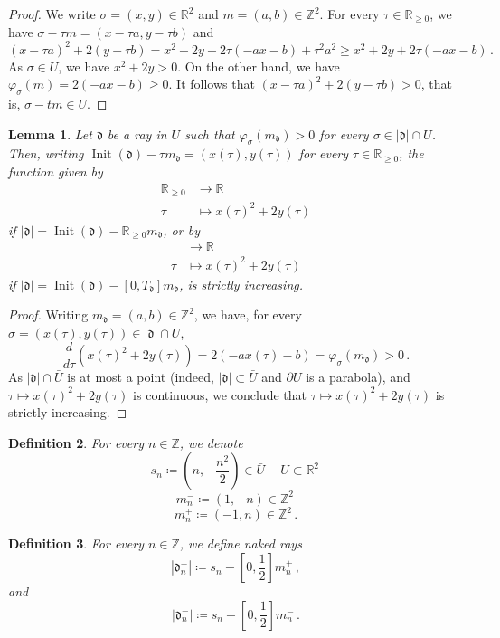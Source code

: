 \documentclass[12pt, a4paper]{amsart}
\newtheorem{defn}{Definition}[section]
\newtheorem{lem}[defn]{Lemma}
\newcommand\R{\mathbb R}
\newcommand\Z{\mathbb Z}
\newcommand\fd{\mathfrak d}
\newcommand\Init{\operatorname{Init}}
\begin{document}
\begin{proof}
We write $\sigma=(x,y) \in \R^2$ and 
$m=(a,b) \in \Z^2$. For every $\tau \in \R_{\geqslant 0}$, we have 
$\sigma -\tau m=(x-\tau a, y-\tau b)$ and
\[(x-\tau a)^2+2(y-\tau b)=x^2+2y+2\tau(-ax-b)+\tau^2 a^2 \geqslant x^2+2y+2\tau(-ax-b)\,.\]
As $\sigma \in U$, we have $x^2+2y>0$. 
On the other hand, we have $\varphi_\sigma(m)=2(-ax-b) \geqslant 0$. It follows that $(x-\tau a)^2+2(y-\tau b)>0$, that is, 
$\sigma -tm \in U$.
\end{proof}

\begin{lem} \label{lem_x2+2y_increasing}
Let $\fd$ be a ray in $U$ such that 
$\varphi_{\sigma}(m_\fd)>0$ for every 
$\sigma \in |\fd| \cap U$. 
Then, writing 
$\Init(\fd)-\tau m_\fd=(x(\tau),y(\tau))$ for every
$\tau \in \R_{\geqslant 0}$, the function given by  
\begin{align*} \R_{\geqslant 0} &\longrightarrow \R \\
\tau &\longmapsto x(\tau)^2+2y(\tau)
\end{align*}
if $|\fd|=\Init(\fd)-\R_{\geqslant 0} m_\fd$, or by 
\begin{align*} [0,T_\fd]& \longrightarrow \R\\
 \tau &\longmapsto x(\tau)^2+2y(\tau)
\end{align*}
if $|\fd|=\Init(\fd)-[0,T_\fd]m_\fd$, is strictly increasing.
\end{lem}

\begin{proof}
Writing $m_\fd=(a,b) \in \Z^2$, we have, for every 
$\sigma=(x(\tau),y(\tau)) \in |\fd| \cap U$, 
\[ \frac{d}{d\tau}(x(\tau)^2+2y(\tau))=2(-ax(\tau)-b)
=\varphi_{\sigma}(m_\fd)>0\,.\]
As $|\fd| \cap \bar{U}$ is at most a
point (indeed, $|\fd| \subset \bar{U}$ 
and $\partial{U}$ is a parabola), and 
$\tau \mapsto x(\tau)^2+2y(\tau)$ is continuous, we conclude that 
$\tau \mapsto x(\tau)^2+2y(\tau)$ is strictly increasing.
\end{proof}

\begin{defn}
For every $n \in \Z$, we denote \[s_n \coloneq (n,-\frac{n^2}{2}) \in \bar{U}-U \subset \R^2\,\] 
\[m_n^{-} \coloneq (1,-n) \in \Z^2\,\] 
\[m_n^{+} \coloneq (-1,n) \in \Z^2\,.\]
\end{defn}

\begin{defn} \label{def_first_scattering}
For every $n \in \Z$, we define naked rays
\[|\fd_n^{+}| \coloneq s_n - [0,\frac{1}{2}]m_n^+\,,\]
and 
\[|\fd_n^{-}| \coloneq s_n - [0,\frac{1}{2}]m_n^{-}\,.\]
\end{defn}
\end{document}
